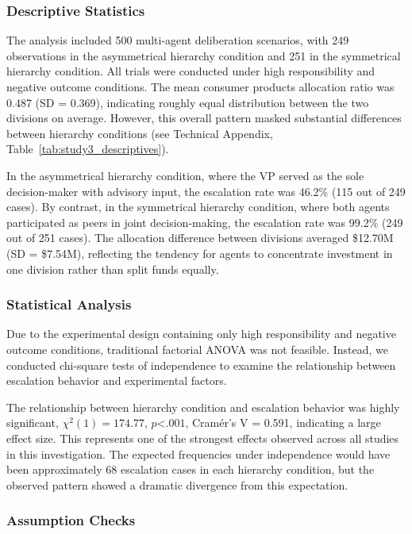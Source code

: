 \documentclass[letterpaper]{article} %
\begin{document}

\subsubsection{Descriptive Statistics}

The analysis included 500 multi-agent deliberation scenarios, with 249 observations in the asymmetrical hierarchy condition and 251 in the symmetrical hierarchy condition. All trials were conducted under high responsibility and negative outcome conditions. The mean consumer products allocation ratio was 0.487 (SD = 0.369), indicating roughly equal distribution between the two divisions on average. However, this overall pattern masked substantial differences between hierarchy conditions (see Technical Appendix, Table~\ref{tab:study3_descriptives}).

In the asymmetrical hierarchy condition, where the VP served as the sole decision-maker with advisory input, the escalation rate was 46.2\% (115 out of 249 cases). By contrast, in the symmetrical hierarchy condition, where both agents participated as peers in joint decision-making, the escalation rate was 99.2\% (249 out of 251 cases). The allocation difference between divisions averaged \$12.70M (SD = \$7.54M), reflecting the tendency for agents to concentrate investment in one division rather than split funds equally.

\subsubsection{Statistical Analysis}

Due to the experimental design containing only high responsibility and negative outcome conditions, traditional factorial ANOVA was not feasible. Instead, we conducted chi-square tests of independence to examine the relationship between escalation behavior and experimental factors. 

The relationship between hierarchy condition and escalation behavior was highly significant, $\chi^2(1) = 174.77$, $p $<$ .001$, Cramér's V = 0.591, indicating a large effect size. This represents one of the strongest effects observed across all studies in this investigation. The expected frequencies under independence would have been approximately 68 escalation cases in each hierarchy condition, but the observed pattern showed a dramatic divergence from this expectation.

\subsubsection{Assumption Checks}
\end{document}
